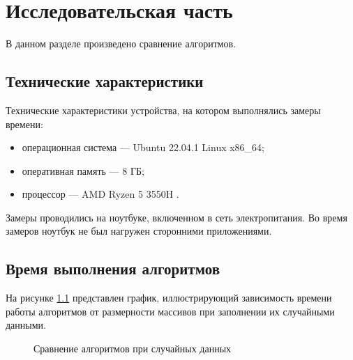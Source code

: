 \chapter{Исследовательская часть}

В данном разделе произведено сравнение  алгоритмов.

\section{Технические характеристики}

Технические характеристики устройства, на котором выполнялись замеры времени:

\begin{itemize}
	\item операционная система --- Ubuntu 22.04.1 Linux x86\_64;
	\item оперативная память --- 8 ГБ;
	\item процессор --- AMD Ryzen 5 3550H \cite{amd}.
\end{itemize}

Замеры проводились на ноутбуке, включенном в сеть электропитания. Во время замеров ноутбук не был нагружен сторонними приложениями.

\section{Время выполнения алгоритмов}

На рисунке \ref{img:g1} представлен график, иллюстрирующий зависимость времени работы алгоритмов от размерности массивов при заполнении их случайными данными.

\begin{figure}[h!]
	\centering
	\caption{Сравнение алгоритмов при случайных данных}
	\label{img:g1}
\end{figure}

